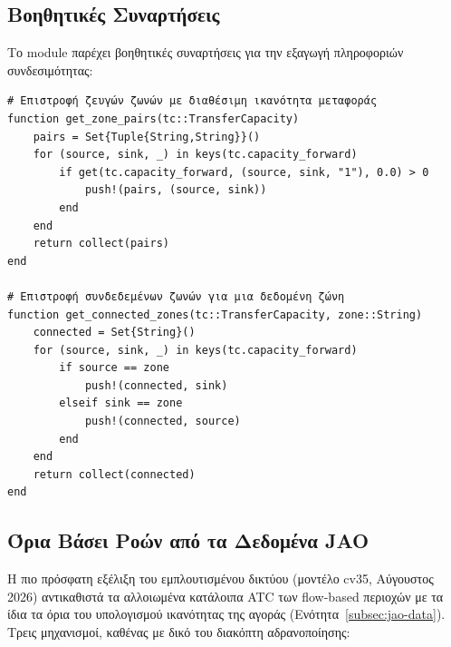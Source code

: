 \subsection{Βοηθητικές Συναρτήσεις}
\label{subsec:network-utilities}

Το module παρέχει βοηθητικές συναρτήσεις για την εξαγωγή πληροφοριών συνδεσιμότητας:

\begin{samepage}
\begin{verbatim}
# Επιστροφή ζευγών ζωνών με διαθέσιμη ικανότητα μεταφοράς
function get_zone_pairs(tc::TransferCapacity)
    pairs = Set{Tuple{String,String}}()
    for (source, sink, _) in keys(tc.capacity_forward)
        if get(tc.capacity_forward, (source, sink, "1"), 0.0) > 0
            push!(pairs, (source, sink))
        end
    end
    return collect(pairs)
end

# Επιστροφή συνδεδεμένων ζωνών για μια δεδομένη ζώνη
function get_connected_zones(tc::TransferCapacity, zone::String)
    connected = Set{String}()
    for (source, sink, _) in keys(tc.capacity_forward)
        if source == zone
            push!(connected, sink)
        elseif sink == zone
            push!(connected, source)
        end
    end
    return collect(connected)
end
\end{verbatim}
\end{samepage}

\subsection{Όρια Βάσει Ροών από τα Δεδομένα JAO}
\label{subsec:jao-network}

Η πιο πρόσφατη εξέλιξη του εμπλουτισμένου δικτύου (μοντέλο cv35, Αύγουστος 2026) αντικαθιστά τα αλλοιωμένα κατάλοιπα ATC των flow-based περιοχών με τα ίδια τα όρια του υπολογισμού ικανότητας της αγοράς (Ενότητα~\ref{subsec:jao-data}). Τρεις μηχανισμοί, καθένας με δικό του διακόπτη αδρανοποίησης:

